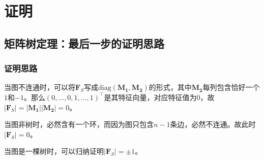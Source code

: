 \documentclass[9pt,dvipsnames]{beamer}
\renewcommand{\det}[1]{\vert{#1}\vert}
\begin{document}
\section{证明}
\subsection{矩阵树定理：最后一步的证明思路}
\begin{frame}
	\frametitle{证明思路}
	\label{appendix:mtt}
	当图不连通时，可以将$\mathbf{F}_S$写成$\mathrm{diag}(\mathbf{M_1},\mathbf{M_2})$的形式，其中$\mathbf{M_2}$每列包含恰好一个$1$和$-1$。那么$(0,\ldots,0,1,\ldots,1)^\top$是其特征向量，对应特征值为$0$，故$\det{\mathbf{F}_S}=\det{\mathbf{M_1}}\det{\mathbf{M_2}}=0$。

	当图非树时，必然含有一个环，而因为图只包含$n-1$条边，必然不连通。故此时$\det{\mathbf{F}_S}=0$。

	当图是一棵树时，可以归纳证明$\det{\mathbf{F}_S}=\pm 1$。
\end{frame}
\end{document}
